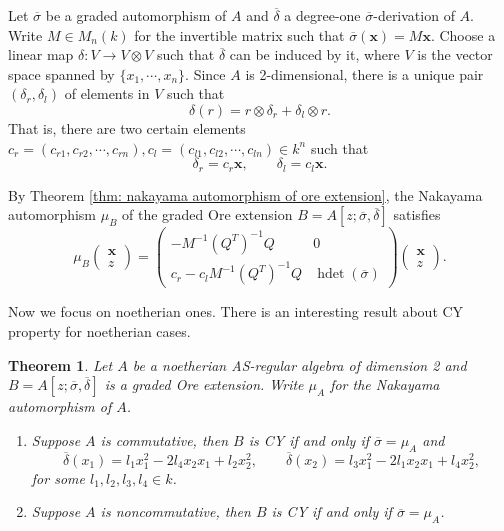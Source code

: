 \documentclass[a4paper,10pt]{amsart}
\newtheorem{theorem}{Theorem}[section]
\theoremstyle{definition}
\numberwithin{equation}{section}
\DeclareMathOperator{\hdet}{hdet}
\begin{document}
Let $\overline{\sigma}$ be a graded automorphism of $A$ and $\overline{\delta}$ a degree-one $\overline{\sigma}$-derivation of $A$. Write $M\in M_n(k)$ for the invertible matrix such that $\overline{\sigma}(\mathbf{x})=M\mathbf{x}$.  Choose a linear map $\delta:V\to V\otimes V$ such that $\overline{\delta}$ can be induced by it, where $V$ is the vector space spanned by $\{x_1,\cdots,x_n\}$. Since $A$ is 2-dimensional, there is a unique pair $(\delta_r,\delta_l)$ of elements in $V$ such that
$$
\delta(r)=r\otimes \delta_r+\delta_l\otimes r.
$$
That is, there are two certain elements $c_r=(c_{r1},c_{r2},\cdots,c_{rn}),c_l=(c_{l1},c_{l2},\cdots,c_{ln})\in k^n$ such that
$$
\delta_r=c_r\mathbf{x},\qquad \delta_l=c_l\mathbf{x}.
$$

By Theorem \ref{thm: nakayama automorphism of ore extension}, the Nakayama automorphism $\mu_B$ of the graded Ore extension $B=A[z;\overline{\sigma},\overline{\delta}]$ satisfies
\begin{equation}\label{nakayama of comm}
{\mu_B}\left(\begin{array}{c}\mathbf{x}
\\z\end{array}\right)
=\left(
\begin{array}{cc}
-M^{-1}(Q^T)^{-1}Q &0\\
c_r- c_l M^{-1}(Q^T)^{-1}Q    &\hdet(\overline{\sigma})
\end{array}
\right)
\left(\begin{array}{c}\mathbf{x}
\\z\end{array}\right).
\end{equation}

Now we focus on noetherian ones. There is an interesting result about CY property for noetherian cases.
\begin{theorem}\label{thm: CY for 2-dim}
Let $A$ be a noetherian AS-regular algebra of dimension 2 and $B=A[z;\overline{\sigma},\overline{\delta}]$ is a graded Ore extension. Write $\mu_A$ for the Nakayama automorphism of $A$.
\begin{enumerate}
\item  Suppose $A$ is commutative, then $B$ is CY if and only if $\overline{\sigma}=\mu_A$ and
    $$
    \overline{\delta}(x_1)=l_1x_1^2-2l_4x_2x_1+l_2x_2^2,\qquad
    \overline{\delta}(x_2)=l_3x_1^2-2l_1x_2x_1+l_4x_2^2,
    $$
for some $l_1,l_2,l_3,l_4\in k$.
\item  Suppose $A$ is noncommutative, then $B$ is CY if and only if $\overline{\sigma}=\mu_A$.
\end{enumerate}
\end{theorem}
\end{document}
